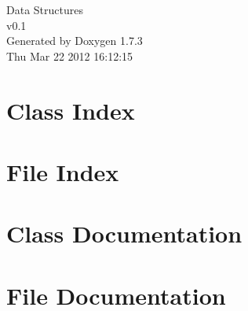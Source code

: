 \documentclass[a4paper]{book}
\begin{document}
\hypersetup{pageanchor=false}
\begin{titlepage}
\vspace*{7cm}
\begin{center}
{\Large Data Structures \\[1ex]\large v0.1 }\\
\vspace*{1cm}
{\large Generated by Doxygen 1.7.3}\\
\vspace*{0.5cm}
{\small Thu Mar 22 2012 16:12:15}\\
\end{center}
\end{titlepage}
\clearemptydoublepage
{}
\tableofcontents
\clearemptydoublepage
{}
\hypersetup{pageanchor=true}
\chapter{Class Index}

\chapter{File Index}

\chapter{Class Documentation}


\chapter{File Documentation}












\printindex
\end{document}
